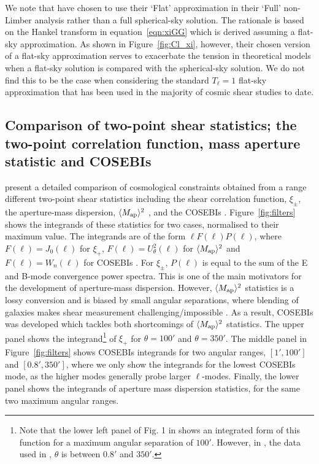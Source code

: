 We note that \citet{kitching/etal:2016} have chosen to use their `Flat' approximation in their `Full' non-Limber analysis rather than a full spherical-sky solution.  The rationale is based on the Hankel transform in equation~\ref{eqn:xiGG} which is derived assuming a flat-sky approximation.  As shown in Figure~\ref{fig:Cl_xi}, however, their chosen version of a flat-sky approximation serves to exacerbate the tension in theoretical models when a flat-sky solution is compared with the spherical-sky solution. We do not find this to be the case when considering the standard $T_\ell = 1$ flat-sky approximation that has been used in the majority of cosmic shear studies to date.

\subsection{Comparison of two-point shear statistics; the two-point correlation function, mass aperture statistic and COSEBIs}
\citet{kilbinger/etal:2013} present a detailed comparison of cosmological constraints obtained from a range different two-point shear statistics including the shear correlation function, $\xi_\pm$, the aperture-mass dispersion, $\langle M_ {\rm ap} \rangle ^2$ \citep{schneider/etal:1998}, and the COSEBIs \citep{schneider/etal:2010}.  Figure~\ref{fig:filters} shows the integrands of these statistics 
for two cases, normalised to their maximum value.  The integrands are of the form $\ell F(\ell) P(\ell)$, where $F(\ell)=J_0(\ell)$ for $\xi_+$, $F(\ell)= U^2_\theta(\ell)$ for  $\langle M_ {\rm ap} \rangle^2$ \citep[see][]{schneider/etal:1998} and $F(\ell)=W_n(\ell)$ for COSEBIs \citep[see][]{schneider/etal:2010}. For $\xi_\pm$, $P(\ell)$ is equal to the sum of the E and B-mode convergence power spectra. This is one of the main motivators for the development of aperture-mass dispersion. However, $\langle M_ {\rm ap} \rangle ^2$ statistics is a lossy conversion and is biased by small angular separations,
where blending of galaxies makes shear measurement challenging/impossible \citep{kilbinger/etal:2006}. As a result, COSEBIs was developed which tackles both shortcomings of $\langle M_ {\rm ap} \rangle ^2$ statistics.
The upper panel shows the integrand\footnote{Note that the lower left panel of Fig. 1 in \citet{kitching/etal:2016} shows an integrated form of this function for a maximum angular separation of $100'$. However, in \citet{kilbinger/etal:2013}, the data used in \citet{kitching/etal:2016}, $\theta$ is between $0.8'$ and $350'$.} of $\xi_+$ for $\theta=100'$ and $\theta=350'$. The middle panel in Figure~\ref{fig:filters} shows COSEBIs integrands for two angular ranges, $[1',100']$ and $[0.8',350']$, where we only show the integrands for the lowest COSEBIs mode, as the higher modes generally probe larger $\ell$-modes.  Finally, the lower panel shows the integrands of aperture mass dispersion statistics, for the same two maximum angular ranges. 

